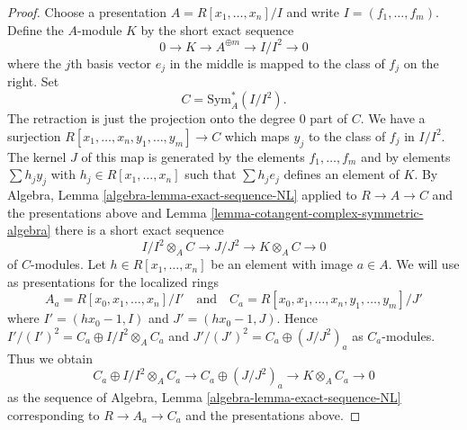 \begin{proof}
Choose a presentation $A = R[x_1, \ldots, x_n]/I$ and write
$I = (f_1, \ldots, f_m)$. Define the $A$-module $K$ by the short exact sequence
$$
0 \to K \to A^{\oplus m} \to I/I^2 \to 0
$$
where the $j$th basis vector $e_j$ in the middle is mapped to the class of
$f_j$ on the right. Set
$$
C = \text{Sym}^*_A(I/I^2).
$$
The retraction is just the projection onto the degree $0$ part of $C$.
We have a surjection $R[x_1, \ldots, x_n, y_1, \ldots, y_m] \to C$
which maps $y_j$ to the class of $f_j$ in $I/I^2$. The kernel $J$ of this
map is generated by the elements $f_1, \ldots, f_m$ and by elements
$\sum h_j y_j$ with $h_j \in R[x_1, \ldots, x_n]$ such that
$\sum h_j e_j$ defines an element of $K$. By
Algebra, Lemma \ref{algebra-lemma-exact-sequence-NL}
applied to $R \to A \to C$ and the presentations above
and Lemma \ref{lemma-cotangent-complex-symmetric-algebra}
there is a short exact sequence
\begin{equation}
\label{equation-sequence}
I/I^2 \otimes_A C \to J/J^2 \to K \otimes_A C \to 0
\end{equation}
of $C$-modules. Let $h \in R[x_1, \ldots, x_n]$ be an element
with image $a \in A$. We will use as presentations for the localized rings
$$
A_a = R[x_0, x_1, \ldots, x_n]/I'
\quad\text{and}\quad
C_a = R[x_0, x_1, \ldots, x_n, y_1, \ldots, y_m]/J'
$$
where $I' = (hx_0 - 1, I)$ and $J' = (hx_0 - 1, J)$. Hence
$I'/(I')^2 = C_a \oplus I/I^2 \otimes_A C_a$ and
$J'/(J')^2 = C_a \oplus (J/J^2)_a$ as $C_a$-modules.
Thus we obtain
\begin{equation}
\label{equation-sequence-localized}
C_a \oplus I/I^2 \otimes_A C_a \to
C_a \oplus (J/J^2)_a \to
K \otimes_A C_a \to 0
\end{equation}
as the sequence of
Algebra, Lemma \ref{algebra-lemma-exact-sequence-NL}
corresponding to $R \to A_a \to C_a$ and the presentations above.


\end{proof}
